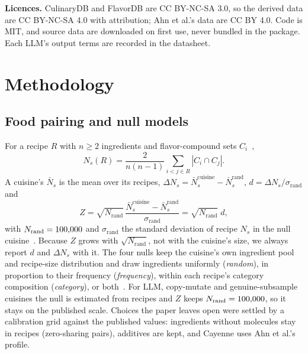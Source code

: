 \documentclass[conference]{IEEEtran}
\newcommand{\Ns}{N_s}
\newcommand{\dNs}{\Delta N_s}
\begin{document}
\textbf{Licences.} CulinaryDB and FlavorDB are CC BY-NC-SA 3.0, so the derived data are CC BY-NC-SA 4.0 with attribution; Ahn et al.'s data are CC BY 4.0. Code is MIT, and source data are downloaded on first use, never bundled in the package. Each LLM's output terms are recorded in the datasheet.

\begin{table}[t]
\centering\caption{LLMCuisine-22 per model: calls (of the \NCallsPerModel{} planned), recipes, regions, instruction following, parsing and aliasing (full-mode calls only; first five recipes per call).}\label{tab:dataset}
\footnotesize\setlength{\tabcolsep}{4pt}
\end{table}

\begin{table}[t]
\centering\caption{Scope of this analysis and planned extensions.}\label{tab:status}
\scriptsize
\end{table}

\section{Methodology}
\subsection{Food pairing and null models}
For a recipe $R$ with $n\geq 2$ ingredients and flavor-compound sets $C_i$~\cite{ahn2011,jain2015},
\begin{equation}
\Ns(R)=\frac{2}{n(n-1)}\sum_{i<j\in R}|C_i\cap C_j| .
\end{equation}
A cuisine's $\bar N_s$ is the mean over its recipes, $\dNs=\bar N_s^{\mathrm{cuisine}}-\bar N_s^{\mathrm{rand}}$, $d=\dNs/\sigma_{\mathrm{rand}}$ and
\begin{equation}
Z=\sqrt{N_{\mathrm{rand}}}\,\frac{\bar N_s^{\mathrm{cuisine}}-\bar N_s^{\mathrm{rand}}}{\sigma_{\mathrm{rand}}}=\sqrt{N_{\mathrm{rand}}}\;d ,
\end{equation}
with $N_{\mathrm{rand}}=100{,}000$ and $\sigma_{\mathrm{rand}}$ the standard deviation of recipe $\Ns$ in the null cuisine~\cite{jain2015,singh2018}. Because $Z$ grows with $\sqrt{N_{\mathrm{rand}}}$, not with the cuisine's size, we always report $d$ and $\dNs$ with it. The four nulls keep the cuisine's own ingredient pool and recipe-size distribution and draw ingredients uniformly (\emph{random}), in proportion to their frequency (\emph{frequency}), within each recipe's category composition (\emph{category}), or both~\cite{singh2018}. For LLM, copy-mutate and genuine-subsample cuisines the null is estimated from \NNullCandidates{} recipes and $Z$ keeps $N_{\mathrm{rand}}=100{,}000$, so it stays on the published scale. Choices the paper leaves open were settled by a calibration grid against the published values: ingredients without molecules stay in recipes (zero-sharing pairs), additives are kept, and Cayenne uses Ahn et al.'s profile.
\end{document}
